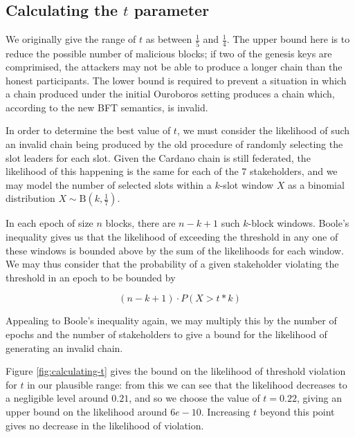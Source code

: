 \documentclass[11pt,a4paper]{article}
\begin{document}
\clearpage


\begin{appendices}
  \section{Calculating the $t$ parameter}
  \label{apdx:calculating-t}

  We originally give the range of $t$ as between $\frac{1}{5}$ and $\frac{1}{4}$.
  The upper bound here is to reduce the possible number of malicious blocks; if
  two of the genesis keys are comprimised, the attackers may not be able to
  produce a longer chain than the honest participants. The lower bound is required
  to prevent a situation in which a chain produced under the initial Ouroboros
  setting produces a chain which, according to the new BFT semantics, is invalid.

  In order to determine the best value of $t$, we must consider the likelihood of
  such an invalid chain being produced by the old procedure of randomly selecting
  the slot leaders for each slot. Given the Cardano chain is still federated, the
  likelihood of this happening is the same for each of the 7 stakeholders, and we
  may model the number of selected slots within a $k$-slot window $X$ as a binomial
  distribution $X \sim \mathrm{B}\left(k, \frac{1}{7}\right)$.

  In each epoch of size $n$ blocks, there are $n-k+1$ such $k$-block windows.
  Boole's inequality gives us that the likelihood of exceeding the threshold in
  any one of these windows is bounded above by the sum of the likelihoods for each
  window. We may thus consider that the probability of a given stakeholder
  violating the threshold in an epoch to be bounded by

  $$(n-k+1)\cdot P(X > t*k)$$

  Appealing to Boole's inequality again, we may multiply this by the number of
  epochs and the number of stakeholders to give a bound for the likelihood of
  generating an invalid chain.

  Figure \ref{fig:calculating-t} gives the bound on the likelihood of threshold
  violation for $t$ in our plausible range: from this we can see that the
  likelihood decreases to a negligible level around $0.21$, and so we choose the
  value of $t=0.22$, giving an upper bound on the likelihood around $6e-10$.
  Increasing $t$ beyond this point gives no decrease in the likelihood of
  violation.


\end{appendices}
\end{document}
